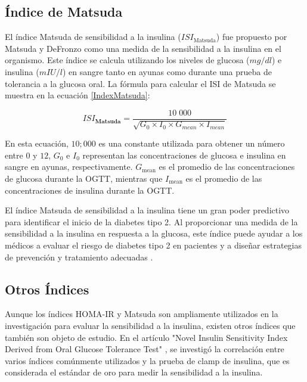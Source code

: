 \subsection{Índice de Matsuda}

El índice Matsuda de sensibilidad a la insulina ($ISI_{\text{Matsuda}}$) fue propuesto por Matsuda y DeFronzo como una medida de la sensibilidad a la insulina en el organismo. Este índice se calcula utilizando los niveles de glucosa ($mg/dl$) e insulina ($mIU/l$) en sangre tanto en ayunas como durante una prueba de tolerancia a la glucosa oral. La fórmula para calcular el ISI de Matsuda se muestra en la ecuación \eqref{IndexMatsuda}:

\begin{equation}\label{IndexMatsuda}
    ISI_{\textbf{Matsuda}} = \frac{10\;000}{\sqrt{G_0 \times I_0 \times G_{mean} \times I_{mean}}}
\end{equation}

En esta ecuación, $10;000$ es una constante utilizada para obtener un número entre $0$ y $12$, $G_0$ e $I_0$ representan las concentraciones de glucosa e insulina en sangre en ayunas, respectivamente. $G_{\text{mean}}$ es el promedio de las concentraciones de glucosa durante la OGTT, mientras que $I_{\text{mean}}$ es el promedio de las concentraciones de insulina durante la OGTT.

El índice Matsuda de sensibilidad a la insulina tiene un gran poder predictivo para identificar el inicio de la diabetes tipo 2. Al proporcionar una medida de la sensibilidad a la insulina en respuesta a la glucosa, este índice puede ayudar a los médicos a evaluar el riesgo de diabetes tipo 2 en pacientes y a diseñar estrategias de prevención y tratamiento adecuadas \cite{indicesRes}.

\subsection{Otros Índices}

Aunque los índices HOMA-IR y Matsuda son ampliamente utilizados en la investigación para evaluar la sensibilidad a la insulina, existen otros índices que también son objeto de estudio. En el artículo "Novel Insulin Sensitivity Index Derived from Oral Glucose Tolerance Test" \cite{NovelInsulin}, se investigó la correlación entre varios índices comúnmente utilizados y la prueba de clamp de insulina, que es considerada el estándar de oro para medir la sensibilidad a la insulina.


